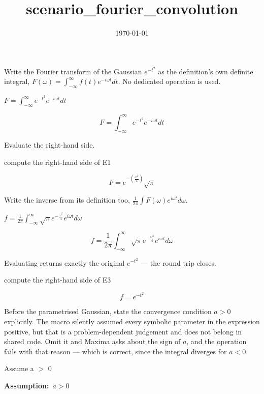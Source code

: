 \documentclass[dvipdfmx]{article}
\title{scenario\_fourier\_convolution}
\date{\today}
\begin{document}
\maketitle

Write the Fourier transform of the Gaussian $e^{-t^2}$ as the definition's own definite integral, $F(\omega)=\int_{-\infty}^{\infty} f(t)e^{-i\omega t}dt$. No dedicated operation is used.

$F = \int_{-\infty}^{\infty} e^{-t^2} e^{-i \omega t} dt$

\begin{equation}
  F = \int_{-\infty}^{\infty} e^{-t^2} e^{-i \omega t} dt
  \label{eq:E1}
\end{equation}

Evaluate the right-hand side.

compute the right-hand side of E1

\begin{equation}
  F = e^ {- \left(\frac{\omega^2}{4}\right) } \sqrt{\pi}
  \label{eq:E2}
\end{equation}

Write the inverse from its definition too, $\frac{1}{2\pi}\int F(\omega)e^{i\omega t}d\omega$.

$f = \frac{1}{2\pi}\int_{-\infty}^{\infty} \sqrt{\pi} e^{-\frac{\omega^2}{4}} e^{i \omega t} d\omega$

\begin{equation}
  f = \frac{1}{2\pi}\int_{-\infty}^{\infty} \sqrt{\pi} e^{-\frac{\omega^2}{4}} e^{i \omega t} d\omega
  \label{eq:E3}
\end{equation}

Evaluating returns exactly the original $e^{-t^2}$ — the round trip closes.

compute the right-hand side of E3

\begin{equation}
  f = e^ {- t^2 }
  \label{eq:E4}
\end{equation}

Before the parametrised Gaussian, state the convergence condition $a>0$ explicitly. The macro silently assumed every symbolic parameter in the expression positive, but that is a problem-dependent judgement and does not belong in shared code. Omit it and Maxima asks about the sign of $a$, and the operation fails with that reason — which is correct, since the integral diverges for $a<0$.

Assume a $>$ 0

\noindent\textbf{Assumption:}\ $\displaystyle a > 0$\par
\end{document}
